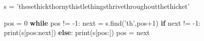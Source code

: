 \documentclass[]{article}
\newenvironment{Shaded}{}{}
\newcommand{\DecValTok}[1]{\textcolor[rgb]{0.25,0.63,0.44}{{#1}}}
\newcommand{\StringTok}[1]{\textcolor[rgb]{0.25,0.44,0.63}{{#1}}}
\newcommand{\ControlFlowTok}[1]{\textcolor[rgb]{0.00,0.44,0.13}{\textbf{{#1}}}}
\newcommand{\OperatorTok}[1]{\textcolor[rgb]{0.40,0.40,0.40}{{#1}}}
\newcommand{\BuiltInTok}[1]{{#1}}
\newcommand{\NormalTok}[1]{{#1}}
\begin{document}
\begin{enumerate}
\begin{Shaded}
\begin{Highlighting}[]
\NormalTok{s }\OperatorTok{=} \StringTok{'thesethickthornythistlethingsthrivethroughoutthethicket'}

\NormalTok{pos }\OperatorTok{=} \DecValTok{0}
\ControlFlowTok{while} \NormalTok{pos }\OperatorTok{!=} \OperatorTok{-}\DecValTok{1}\NormalTok{:}
    \BuiltInTok{next} \OperatorTok{=} \NormalTok{s.find(}\StringTok{'th'}\NormalTok{,pos}\DecValTok{+1}\NormalTok{)}
    \ControlFlowTok{if} \BuiltInTok{next} \OperatorTok{!=} \OperatorTok{-}\DecValTok{1}\NormalTok{:}
        \BuiltInTok{print}\NormalTok{(s[pos:}\BuiltInTok{next}\NormalTok{])}
    \ControlFlowTok{else}\NormalTok{:}
        \BuiltInTok{print}\NormalTok{(s[pos:])}
    \NormalTok{pos }\OperatorTok{=} \BuiltInTok{next}
\end{Highlighting}
\end{Shaded}
\end{enumerate}
\end{document}
